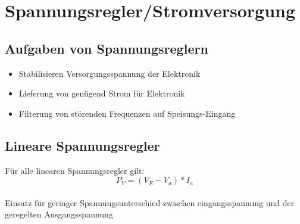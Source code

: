 \section{Spannungsregler/Stromversorgung}
\subsection{Aufgaben von Spannungsreglern}
\begin{itemize}
  \item Stabilisieren Versorgungsspannung der Elektronik
  \item Lieferung von genügend Strom für Elektronik
  \item Filterung von störenden Frequenzen auf Speisungs-Eingang
\end{itemize}

\subsection{Lineare Spannungsregler}
Für alle linearen Spannungsregler gilt: \begin{equation}
P_{V}=(V_{E}-V_{a})*I_{a}
\end{equation}\\
Einsatz für geringer Spannungsunterschied zwischen eingangsspannung und der
geregelten Ausgangsspannung

